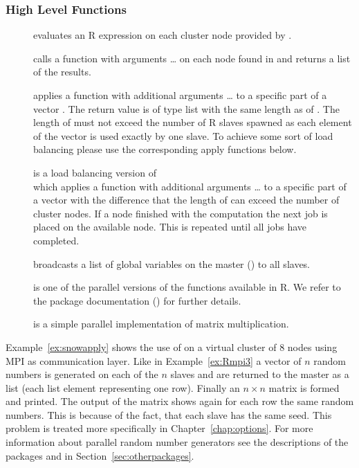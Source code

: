 \subsubsection{High Level Functions}
\begin{description}
\item[] evaluates an R expression
   on
  each cluster node provided by . 
\item[] calls a function
   with arguments \ldots{} on each node found in 
  and returns a list of the results.
\item[] applies a function
   with additional arguments \ldots{} to a specific part of
  a vector . The return value is of type list with the same
  length as of . The length of
   must not exceed the 
  number of R slaves spawned as each element of the vector is used
  exactly by one slave. To achieve some sort of load balancing please
  use the corresponding apply functions below.
\item[] is a load balancing
  version of \\  which applies a function
   with additional arguments \ldots{} to a specific part of
  a vector  with the difference that the length of
   can exceed the number of cluster nodes. If a node
  finished with the computation the next job is placed on the
  available node. This is repeated until all jobs have completed.
\item[] broadcasts a list of global
  variables on the master () to all slaves.
\item[] is one of the parallel
  versions of the  functions available in R. We refer to
  the package documentation (\cite{tierney07snow}) for further details.
\item[] is a simple parallel implementation of
  matrix multiplication. 
\end{description}

Example~\ref{ex:snowapply} shows the use of  on a
virtual cluster of 8 nodes using MPI as communication layer. Like in
Example~\ref{ex:Rmpi3} a vector of $n$ random numbers is generated on
each of the $n$ slaves and are returned to the master as a
list (each list element representing one row). Finally an $n  \times n$
matrix is formed and printed. The output of the matrix shows again for
each row the same random numbers. This is because of the fact, that
each slave has the same seed. This problem is treated more specifically in
Chapter~\ref{chap:options}. For more information about parallel random
number generators see the descriptions of the packages 
and  in Section~\ref{sec:otherpackages}. 

